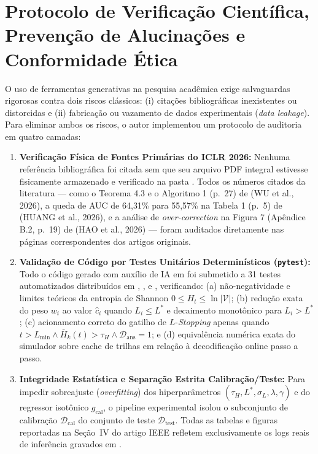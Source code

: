 \documentclass[9pt,a4paper]{extarticle}
\begin{document}
\section{Protocolo de Verifica\c{c}\~{a}o Cient\'{i}fica, Preven\c{c}\~{a}o de Alucina\c{c}\~{o}es e Conformidade \'{E}tica}

O uso de ferramentas generativas na pesquisa acad\^{e}mica exige salvaguardas rigorosas contra dois riscos cl\'{a}ssicos: (i) cita\c{c}\~{o}es bibliogr\'{a}ficas inexistentes ou distorcidas e (ii) fabrica\c{c}\~{a}o ou vazamento de dados experimentais (\textit{data leakage}). Para eliminar ambos os riscos, o autor implementou um protocolo de auditoria em quatro camadas:

\begin{enumerate}[leftmargin=1.4em, itemsep=1.5pt, topsep=1pt]
    \item \textbf{Verifica\c{c}\~{a}o F\'{i}sica de Fontes Prim\'{a}rias do ICLR 2026:} Nenhuma refer\^{e}ncia bibliogr\'{a}fica foi citada sem que seu arquivo PDF integral estivesse fisicamente armazenado e verificado na pasta . Todos os n\'{u}meros citados da literatura --- como o Teorema 4.3 e o Algoritmo 1 (p.~27) de (WU et al., 2026), a queda de AUC de 64,31\% para 55,57\% na Tabela 1 (p.~5) de (HUANG et al., 2026), e a an\'{a}lise de \textit{over-correction} na Figura 7 (Ap\^{e}ndice B.2, p.~19) de (HAO et al., 2026) --- foram auditados diretamente nas p\'{a}ginas correspondentes dos artigos originais.
    \item \textbf{Valida\c{c}\~{a}o de C\'{o}digo por Testes Unit\'{a}rios Determin\'{i}sticos (\texttt{pytest}):} Todo o c\'{o}digo gerado com aux\'{i}lio de IA em  foi submetido a 31 testes automatizados distribu\'{i}dos em , ,  e , verificando: (a) n\~{a}o-negatividade e limites te\'{o}ricos da entropia de Shannon $0 \le H_t \le \ln|\mathcal{V}|$; (b) redu\c{c}\~{a}o exata do peso $w_i$ ao valor $\hat{c}_i$ quando $L_i \le L^*$ e decaimento monot\^{o}nico para $L_i > L^*$; (c) acionamento correto do gatilho de $L$-\textit{Stopping} apenas quando $t > L_{\min} \wedge \bar{H}_k(t) > \tau_H \wedge \mathcal{D}_{\text{ans}} = 1$; e (d) equival\^{e}ncia num\'{e}rica exata do simulador sobre cache de trilhas em rela\c{c}\~{a}o \`{a} decodifica\c{c}\~{a}o online passo a passo.
    \item \textbf{Integridade Estat\'{i}stica e Separa\c{c}\~{a}o Estrita Calibra\c{c}\~{a}o/Teste:} Para impedir sobreajuste (\textit{overfitting}) dos hiperpar\^{a}metros $(\tau_H, L^*, \sigma_L, \lambda, \gamma)$ e do regressor isot\^{o}nico $g_{\text{cal}}$, o pipeline experimental isolou o subconjunto de calibra\c{c}\~{a}o $\mathcal{D}_{\text{cal}}$ do conjunto de teste $\mathcal{D}_{\text{test}}$. Todas as tabelas e figuras reportadas na Se\c{c}\~{a}o~IV do artigo IEEE refletem exclusivamente os logs reais de infer\^{e}ncia gravados em .

\end{enumerate}
\end{document}
